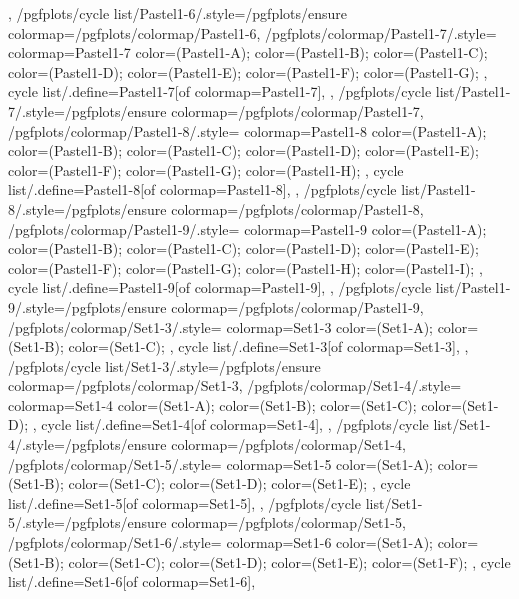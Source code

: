 {{  },
  /pgfplots/cycle list/Pastel1-6/.style={/pgfplots/ensure colormap={/pgfplots/colormap/Pastel1-6}},
  /pgfplots/colormap/Pastel1-7/.style={
    colormap={Pastel1-7}{
      color=(Pastel1-A);
      color=(Pastel1-B);
      color=(Pastel1-C);
      color=(Pastel1-D);
      color=(Pastel1-E);
      color=(Pastel1-F);
      color=(Pastel1-G);
    },
    cycle list/.define={Pastel1-7}{[of colormap=Pastel1-7]},
  },
  /pgfplots/cycle list/Pastel1-7/.style={/pgfplots/ensure colormap={/pgfplots/colormap/Pastel1-7}},
  /pgfplots/colormap/Pastel1-8/.style={
    colormap={Pastel1-8}{
      color=(Pastel1-A);
      color=(Pastel1-B);
      color=(Pastel1-C);
      color=(Pastel1-D);
      color=(Pastel1-E);
      color=(Pastel1-F);
      color=(Pastel1-G);
      color=(Pastel1-H);
    },
    cycle list/.define={Pastel1-8}{[of colormap=Pastel1-8]},
  },
  /pgfplots/cycle list/Pastel1-8/.style={/pgfplots/ensure colormap={/pgfplots/colormap/Pastel1-8}},
  /pgfplots/colormap/Pastel1-9/.style={
    colormap={Pastel1-9}{
      color=(Pastel1-A);
      color=(Pastel1-B);
      color=(Pastel1-C);
      color=(Pastel1-D);
      color=(Pastel1-E);
      color=(Pastel1-F);
      color=(Pastel1-G);
      color=(Pastel1-H);
      color=(Pastel1-I);
    },
    cycle list/.define={Pastel1-9}{[of colormap=Pastel1-9]},
  },
  /pgfplots/cycle list/Pastel1-9/.style={/pgfplots/ensure colormap={/pgfplots/colormap/Pastel1-9}},
  /pgfplots/colormap/Set1-3/.style={
    colormap={Set1-3}{
      color=(Set1-A);
      color=(Set1-B);
      color=(Set1-C);
    },
    cycle list/.define={Set1-3}{[of colormap=Set1-3]},
  },
  /pgfplots/cycle list/Set1-3/.style={/pgfplots/ensure colormap={/pgfplots/colormap/Set1-3}},
  /pgfplots/colormap/Set1-4/.style={
    colormap={Set1-4}{
      color=(Set1-A);
      color=(Set1-B);
      color=(Set1-C);
      color=(Set1-D);
    },
    cycle list/.define={Set1-4}{[of colormap=Set1-4]},
  },
  /pgfplots/cycle list/Set1-4/.style={/pgfplots/ensure colormap={/pgfplots/colormap/Set1-4}},
  /pgfplots/colormap/Set1-5/.style={
    colormap={Set1-5}{
      color=(Set1-A);
      color=(Set1-B);
      color=(Set1-C);
      color=(Set1-D);
      color=(Set1-E);
    },
    cycle list/.define={Set1-5}{[of colormap=Set1-5]},
  },
  /pgfplots/cycle list/Set1-5/.style={/pgfplots/ensure colormap={/pgfplots/colormap/Set1-5}},
  /pgfplots/colormap/Set1-6/.style={
    colormap={Set1-6}{
      color=(Set1-A);
      color=(Set1-B);
      color=(Set1-C);
      color=(Set1-D);
      color=(Set1-E);
      color=(Set1-F);
    },
    cycle list/.define={Set1-6}{[of colormap=Set1-6]},
}}
